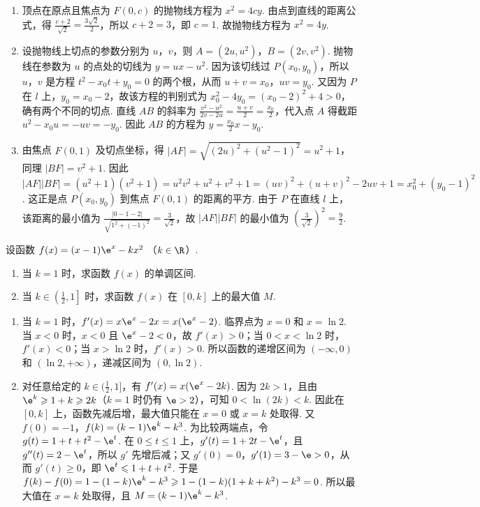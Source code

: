 \begin{solution}
\begin{enumerate}
\item 顶点在原点且焦点为 \(F(0,c)\) 的抛物线方程为 \(x^2=4cy\). 由点到直线的距离公式，得 \(\frac{c+2}{\sqrt2}=\frac{3\sqrt2}{2}\)，所以 \(c+2=3\)，即 \(c=1\). 故抛物线方程为 \(x^2=4y\).
\item 设抛物线上切点的参数分别为 \(u\)，\(v\)，则 \(A=(2u,u^2)\)，\(B=(2v,v^2)\). 抛物线在参数为 \(u\) 的点处的切线为 \(y=ux-u^2\). 因为该切线过 \(P(x_0,y_0)\)，所以 \(u\)，\(v\) 是方程 \(t^2-x_0t+y_0=0\) 的两个根，从而 \(u+v=x_0\)，\(uv=y_0\). 又因为 \(P\) 在 \(l\) 上，\(y_0=x_0-2\)，故该方程的判别式为 \(x_0^2-4y_0=(x_0-2)^2+4>0\)，确有两个不同的切点. 直线 \(AB\) 的斜率为 \(\frac{v^2-u^2}{2v-2u}=\frac{u+v}{2}=\frac{x_0}{2}\)，代入点 \(A\) 得截距 \(u^2-x_0u=-uv=-y_0\). 因此 \(AB\) 的方程为 \(y=\frac{x_0}{2}x-y_0\).
\item 由焦点 \(F(0,1)\) 及切点坐标，得 \(|AF|=\sqrt{(2u)^2+(u^2-1)^2}=u^2+1\)，同理 \(|BF|=v^2+1\). 因此
\(|AF||BF|=(u^2+1)(v^2+1)=u^2v^2+u^2+v^2+1=(uv)^2+(u+v)^2-2uv+1=x_0^2+(y_0-1)^2\). 这正是点 \(P(x_0,y_0)\) 到焦点 \(F(0,1)\) 的距离的平方. 由于 \(P\) 在直线 \(l\) 上，该距离的最小值为 \(\frac{|0-1-2|}{\sqrt{1^2+(-1)^2}}=\frac3{\sqrt2}\)，故 \(|AF||BF|\) 的最小值为 \(\left(\frac3{\sqrt2}\right)^2=\frac92\).
\end{enumerate}
\end{solution}

\begin{problem}
设函数 \(f(x) = (x - 1)\e^{x} - kx^{2} \) （\(k \in \R\)）.

\begin{enumerate}
\item 当 \(k = 1\) 时，求函数 \(f(x)\) 的单调区间.
\item 当 \(k \in \left(\frac{1}{2}, 1\right]\) 时，求函数 \(f(x)\) 在 \([0, k]\) 上的最大值 \(M\).
\end{enumerate}
\end{problem}

\begin{solution}
\begin{enumerate}
\item 当 \(k=1\) 时，\(f'(x)=x\e^x-2x=x(\e^x-2)\). 临界点为 \(x=0\) 和 \(x=\ln2\). 当 \(x<0\) 时，\(x<0\) 且 \(\e^x-2<0\)，故 \(f'(x)>0\)；当 \(0<x<\ln2\) 时，\(f'(x)<0\)；当 \(x>\ln2\) 时，\(f'(x)>0\). 所以函数的递增区间为 \((-\infty,0)\) 和 \((\ln2,+\infty)\)，递减区间为 \((0,\ln2)\).
\item 对任意给定的 \(k\in(\frac12,1]\)，有 \(f'(x)=x(\e^x-2k)\). 因为 \(2k>1\)，且由 \(\e^k\geqslant1+k\geqslant2k\)（\(k=1\) 时仍有 \(\e>2\)），可知 \(0<\ln(2k)<k\). 因此在 \([0,k]\) 上，函数先减后增，最大值只能在 \(x=0\) 或 \(x=k\) 处取得. 又 \(f(0)=-1\)，\(f(k)=(k-1)\e^k-k^3\). 为比较两端点，令 \(g(t)=1+t+t^2-\e^t\). 在 \(0\leqslant t\leqslant1\) 上，\(g'(t)=1+2t-\e^t\)，且 \(g''(t)=2-\e^t\)，所以 \(g'\) 先增后减；又 \(g'(0)=0\)，\(g'(1)=3-\e>0\)，从而 \(g'(t)\geqslant0\)，即 \(\e^t\leqslant1+t+t^2\). 于是
\(f(k)-f(0)=1-(1-k)\e^k-k^3\geqslant1-(1-k)(1+k+k^2)-k^3=0\). 所以最大值在 \(x=k\) 处取得，且 \(M=(k-1)\e^k-k^3\).
\end{enumerate}
\end{solution}

